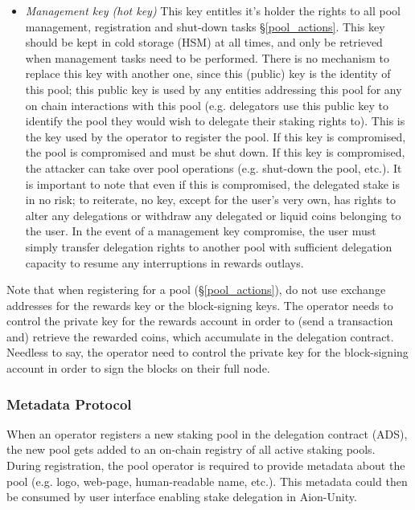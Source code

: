 \begin{itemize}
    \item \textit{Management key (hot key)} This key entitles it's holder the rights to all pool management, registration and shut-down tasks \S\ref{pool_actions}. This key should be kept in cold storage (HSM) at all times, and only be retrieved when management tasks need to be performed. There is no mechanism to replace this key with another one, since this (public) key is the identity of this pool; this public key is used by any entities addressing this pool for any on chain interactions with this pool (e.g. delegators use this public key to identify the pool they would wish to delegate their staking rights to). This is the key used by the operator to register the pool. If this key is compromised, the pool is compromised and must be shut down. If this key is compromised, the attacker can take over pool operations (e.g. shut-down the pool, etc.). It is important to note that even if this  is compromised, the delegated stake is in no risk; to reiterate, no key, except for the user's very own, has rights to alter any delegations or withdraw any delegated or liquid coins belonging to the user. In the event of a management key compromise, the user must simply transfer delegation rights to another pool with sufficient delegation capacity to resume any interruptions in rewards outlays. 
\end{itemize}

Note that when registering for a pool (\S\ref{pool_actions}), do not use exchange addresses for the rewards key or the block-signing keys. The operator needs to control the private key for the rewards account in order to (send a transaction and) retrieve the rewarded coins, which accumulate in the delegation contract. Needless to say, the operator need to control the private key for the block-signing account in order to sign the blocks on their full node.   

\subsubsection{Metadata Protocol} \label{metadata_protocol}
When an operator registers a new staking pool in the delegation contract (ADS), the new pool gets added to an on-chain registry of all active staking pools. During registration, the pool operator is required to provide metadata about the pool (e.g. logo, web-page, human-readable name, etc.). This metadata could then be consumed by user interface enabling stake delegation in Aion-Unity. 

